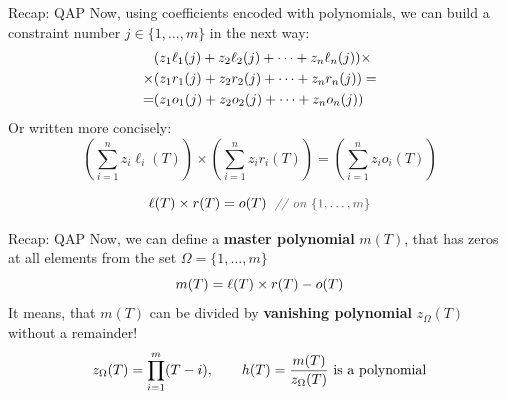 \documentclass{zkdl-presentation-template}
\begin{document}
    \begin{frame}{Recap: QAP}
        \vspace{-5pt}
        Now, using coefficients encoded with polynomials, we can build a constraint number
        $j \in \{1, \dots, m\}$ in the next way:
        \vspace{-5pt}
        \begin{align*}
            &(z_1\ell_1(j) + z_2\ell_2(j) + \dots + z_n\ell_n(j)) \times \\
            \times &(z_1r_1(j) + z_2r_2(j) + \dots + z_nr_n(j)) = \\
            = &(z_1o_1(j) + z_2o_2(j) + \dots + z_no_n(j))
            \vspace{-5pt}
        \end{align*}
        \pause
        Or written more concisely:
        \vspace{-5pt}
        \begin{equation*}
            \left( \sum_{i = 1}^{n} z_i\ell_i(T) \right) \times \left( \sum_{i = 1}^{n} z_ir_i(T) \right) = \left( \sum_{i = 1}^{n} z_io_i(T) \right)
        \end{equation*}

        \vspace{-5pt}
        \begin{equation*}
            \ell(T) \times r(T) = o(T) \; \commentgray{on $\{1,\dots,m\}$}
        \end{equation*}
    \end{frame}

    \begin{frame}{Recap: QAP}
        Now, we can define a \textbf{master polynomial} $m(T)$, that has zeros at all elements from the set
        $\Omega = \{1,\dots,m\}$
        \vspace{-5pt}
        \begin{equation*}
            m(T) = \ell(T) \times r(T) - o(T)
            \vspace{-5pt}
        \end{equation*}
        \pause
        It means, that $m(T)$ can be divided by \textbf{vanishing polynomial} $z_{\Omega}(T)$ without a remainder!
        \vspace{-8pt}
        \begin{equation*}
            z_{\Omega}(T) = \prod_{i=1}^m (T - i), \qquad \text{$h(T) = \frac{m(T)}{z_{\Omega}(T)}$ is a polynomial}
            \vspace{-5pt}
        \end{equation*}
    \end{frame}
\end{document}
